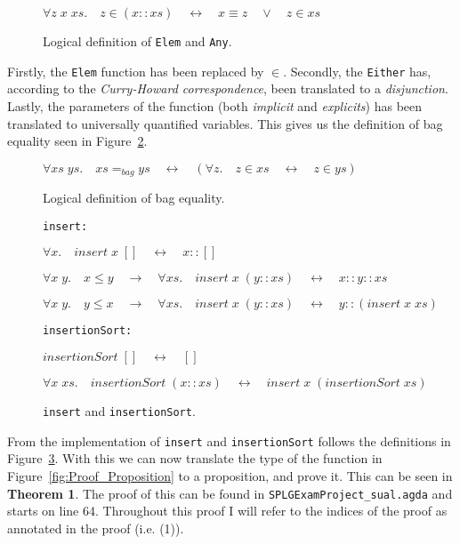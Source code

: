 \documentclass[oribibl, fleqn]{llncs}
\begin{document}
\begin{figure}
\centerline{
$\forall z\; x\; xs.\quad z\in (x::xs)\quad \leftrightarrow \quad x\equiv z \quad \vee \quad z\in xs$
}
\caption{Logical definition of \texttt{Elem} and \texttt{Any}.}
\label{fig:any_log}
\end{figure}

Firstly, the \texttt{Elem} function has been replaced by $\in$. Secondly, the \texttt{Either} has, according to the \emph{Curry-Howard correspondence}, been translated to a \emph{disjunction}. Lastly, the parameters of the function (both \emph{implicit} and \emph{explicits}) has been translated to universally quantified variables. This gives us the definition of bag equality seen in Figure~\ref{fig:bag_eq_log}.

\begin{figure}
\centerline{
$\forall xs\; ys. \quad xs =_{bag} ys \quad \leftrightarrow \quad  (\forall z. \quad z\in xs \quad \leftrightarrow \quad z \in ys)$
}
\caption{Logical definition of bag equality.}
\label{fig:bag_eq_log}
\end{figure}

\begin{figure}
\texttt{insert:}\\
\centerline{
$\forall x. \quad insert \;x \; [] \quad \leftrightarrow \quad x :: []$
}
\centerline{
  $\forall x\;y. \quad x \leq y \quad \to \quad \forall xs. \quad insert\;x\;(y :: xs) \quad \leftrightarrow \quad x :: y :: xs$
}
\centerline{
  $\forall x\;y. \quad y \leq x \quad \to \quad \forall xs. \quad insert\;x\;(y :: xs) \quad \leftrightarrow \quad y :: (insert\;x\;xs)$
}
\texttt{insertionSort:} \\
\centerline{
$insertionSort\;[] \quad \leftrightarrow \quad []$
}
\centerline{
$\forall x\;xs. \quad insertionSort\;(x :: xs) \quad \leftrightarrow \quad insert\;x\;(insertionSort\;xs)$
}
\caption{\texttt{insert} and \texttt{insertionSort}.}
\label{fig:ins_log}
\end{figure}  

From the implementation of \texttt{insert} and \texttt{insertionSort} follows the definitions in Figure~\ref{fig:ins_log}. With this we can now translate the type of the function in Figure~\ref{fig:Proof_Proposition} to a proposition, and prove it. This can be seen in \textbf{Theorem 1}. The proof of this can be found in \texttt{SPLGExamProject\_sual.agda} and starts on line 64. Throughout this proof I will refer to the indices of the proof as annotated in the proof (i.e. (1)).
\end{document}
